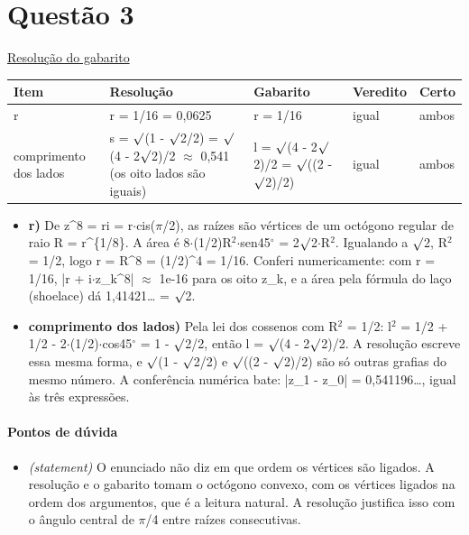 \documentclass{article}%
\begin{document}
\section*{Questão 3}%
\href{https://poliedroresolve.sistemapoliedro.com.br/vestibulares/ita/2027/ita-2-fase-dia-1-20-10-2026-2-fase-dia-1/dissertativa-3-matematica-2-fase-dia-1-ita-2027}{Resolução do gabarito}\par\smallskip%
\begin{longtable}{@{}p{} p{} p{} p{} p{}@{}}\toprule Item & Resolução & Gabarito & Veredito & Certo \\ \midrule
r & r = 1/16 = 0,0625 & r = 1/16 & igual & ambos \\
comprimento dos lados & s = $\surd$(1 - $\surd$2/2) = $\surd$(4 - 2$\surd$2)/2 $\approx$ 0,541 (os oito lados são iguais) & l = $\surd$(4 - 2$\surd$2)/2 = $\surd$((2 - $\surd$2)/2) & igual & ambos \\
\bottomrule\end{longtable}%
\begin{itemize}%
\item%
\textbf{r)} De z\^{}8 = ri = r$\cdot$cis($\pi$/2), as raízes são vértices de um octógono regular de raio R = r\^{}\{1/8\}. A área é 8$\cdot$(1/2)R$^2$$\cdot$sen45$^\circ$ = 2$\surd$2$\cdot$R$^2$. Igualando a $\surd$2, R$^2$ = 1/2, logo r = R\^{}8 = (1/2)\^{}4 = 1/16. Conferi numericamente: com r = 1/16, |r + i$\cdot$z\_k\^{}8| $\approx$ 1e{-}16 para os oito z\_k, e a área pela fórmula do laço (shoelace) dá 1,41421\ldots{} = $\surd$2.%
\item%
\textbf{comprimento dos lados)} Pela lei dos cossenos com R$^2$ = 1/2: l$^2$ = 1/2 + 1/2 - 2$\cdot$(1/2)$\cdot$cos45$^\circ$ = 1 - $\surd$2/2, então l = $\surd$(4 - 2$\surd$2)/2. A resolução escreve essa mesma forma, e $\surd$(1 - $\surd$2/2) e $\surd$((2 - $\surd$2)/2) são só outras grafias do mesmo número. A conferência numérica bate: |z\_1 - z\_0| = 0,541196\ldots{}, igual às três expressões.%
\end{itemize}%
\paragraph{Pontos de dúvida}%
\begin{itemize}%
\item%
\textit{(statement)} O enunciado não diz em que ordem os vértices são ligados. A resolução e o gabarito tomam o octógono convexo, com os vértices ligados na ordem dos argumentos, que é a leitura natural. A resolução justifica isso com o ângulo central de $\pi$/4 entre raízes consecutivas.%
\end{itemize}%
\end{document}
